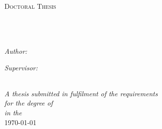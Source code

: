 \documentclass[11pt, oneside]{Thesis} %
\begin{document}
\begin{titlepage}
\begin{center}

\textsc{\LARGE \univname}\\[1.5cm] %
\textsc{\Large Doctoral Thesis}\\[0.5cm] %

\HRule \\[0.4cm] %
{\huge \bfseries \ttitle}\\[0.4cm] %
\HRule \\[1.5cm] %
 
\begin{minipage}{0.4\textwidth}
\begin{flushleft} \large
\emph{Author:}\\
\href{http://www.johnsmith.com}{\authornames} %
\end{flushleft}
\end{minipage}
\begin{minipage}{0.4\textwidth}
\begin{flushright} \large
\emph{Supervisor:} \\
\href{http://www.jamessmith.com}{\supname} %
\end{flushright}
\end{minipage}\\[3cm]
 
\large \textit{A thesis submitted in fulfilment of the requirements\\ for the degree of \degreename}\\[0.3cm] %
\textit{in the}\\[0.4cm]
 
{\large \today}\\[4cm] %
 
\vfill
\end{center}

\end{titlepage}

\newcommand{\note}[1]{\textbf{\textit{\color{blue} #1}}}
\end{document}
